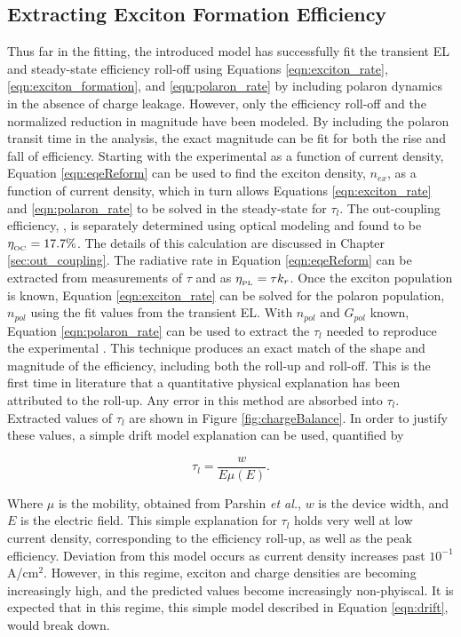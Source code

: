 \documentclass[../thesis.tex]{subfiles}
\begin{document}
\subsection{Extracting Exciton Formation Efficiency}

Thus far in the fitting, the introduced model has successfully fit the transient EL and steady-state efficiency roll-off using Equations \ref{eqn:exciton_rate},\ref{eqn:exciton_formation}, and \ref{eqn:polaron_rate} by including polaron dynamics in the absence of charge leakage.
However, only the efficiency roll-off and the normalized reduction in magnitude have been modeled. 
By including the polaron transit time in the analysis, the exact magnitude can be fit for both the rise and fall of efficiency. 
Starting with the experimental \eqe as a function of current density, Equation \ref{eqn:eqeReform} can be used to find the exciton density, $n_{ex}$, as a function of current density, which in turn allows Equations \ref{eqn:exciton_rate} and \ref{eqn:polaron_rate} to be solved in the steady-state for $\tau_l$.  
The out-coupling efficiency, \oc, is separately determined using optical modeling and found to be $\eta_{_\text{\tiny OC}}=17.7\%$.\cite{Furno2010,Furno2012}  
The details of this calculation are discussed in Chapter \ref{sec:out_coupling}.
The radiative rate in Equation \ref{eqn:eqeReform} can be extracted from measurements of $\tau$ and \pl as $\eta_{_\text{\tiny PL}}=\tau k_r$.  Once the exciton population is known, Equation \ref{eqn:exciton_rate} can be solved for the polaron population, $n_{pol}$ using the fit values from the transient EL.  With $n_{pol}$ and $G_{pol}$ known, Equation \ref{eqn:polaron_rate} can be used to extract the $\tau_l$ needed to reproduce the experimental \eqe.  
This technique produces an exact match of the shape and magnitude of the efficiency, including both the roll-up and roll-off.
This is the first time in literature that a quantitative physical explanation has been attributed to the roll-up.
Any error in this method are absorbed into $\tau_l$.
Extracted values of $\tau_l$ are shown in Figure \ref{fig:chargeBalance}.
In order to justify these values, a simple drift model explanation can be used, quantified by

\begin{equation}
\tau_l=\frac{w}{E\mu(E)}.
\label{eqn:drift}
\end{equation}

Where $\mu$ is the mobility, obtained from Parshin \textit{et al.},\cite{Parshin2006} $w$ is the device width, and $E$ is the electric field.  
This simple explanation for $\tau_l$ holds very well at low current density, corresponding to the efficiency roll-up, as well as the peak efficiency.  
Deviation from this model occurs as current density increases past $10^{-1}$ A/cm$^2$.  
However, in this regime, exciton and charge densities are becoming increasingly high, and the predicted values become increasingly non-phyiscal.
It is expected that in this regime, this simple model described in Equation \ref{eqn:drift}, would break down.
\end{document}
